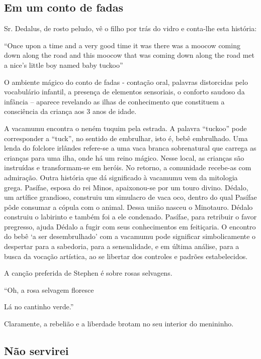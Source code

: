\subsection{Em um conto de fadas}

Sr. Dedalus, de rosto peludo, vê o filho por trás do vidro e conta-lhe
esta história:

``Once upon a time and a very good time it was there was a moocow coming
down along the road and this moocow that was coming down along the road
met a nice's little boy named baby tuckoo''

O ambiente mágico do conto de fadas - contação oral, palavras
distorcidas pelo vocabulário infantil, a presença de elementos
sensoriais, o conforto saudoso da infância -- aparece revelando as ilhas
de conhecimento que constituem a consciência da criança aos 3 anos de
idade.

A vacamumu encontra o neném tuquim pela estrada. A palavra ``tuckoo''
pode corresponder a ``tuck'', no sentido de embrulhar, isto é, bebê
embrulhado. Uma lenda do folclore irlândes refere-se a uma vaca branca
sobrenatural que carrega as crianças para uma ilha, onde há um reino
mágico. Nesse local, as crianças são instruídas e transformam-se em
heróis. No retorno, a comunidade recebe-as com admiração. Outra história
que dá significado à vacamumu vem da mitologia grega. Pasífae, esposa do
rei Minos, apaixonou-se por um touro divino. Dédalo, um artífice
grandioso, construiu um simulacro de vaca oco, dentro do qual Pasífae
pôde consumar a cópula com o animal. Dessa união nasceu o Minotauro.
Dédalo construiu o labirinto e também foi a ele condenado. Pasífae, para
retribuir o favor pregresso, ajuda Dédalo a fugir com seus conhecimentos
em feitiçaria. O encontro do bebê `a ser desembrulhado' com a vacamumu
pode significar simbolicamente o despertar para a sabedoria, para a
sensualidade, e em última análise, para a busca da vocação artística, ao
se libertar dos controles e padrões estabelecidos.

A canção preferida de Stephen é sobre rosas selvagens.

``Oh, a rosa selvagem floresce

Lá no cantinho verde.''

Claramente, a rebelião e a liberdade brotam no seu interior do
menininho.

\subsection{Não servirei}

